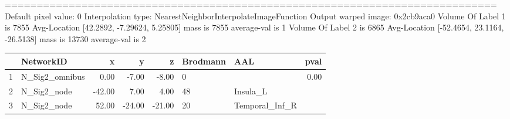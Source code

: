 \documentclass{elsarticle}\usepackage{graphicx, color}
\begin{document}
=============================================================================
Default pixel value: 0
Interpolation type: NearestNeighborInterpolateImageFunction
Output warped image: 0x2cb9aca0
 Volume Of Label 1 is 7855  Avg-Location [42.2892, -7.29624, 5.25805] mass is 7855 average-val is 1
 Volume Of Label 2 is 6865  Avg-Location [-52.4654, 23.1164, -26.5138] mass is 13730 average-val is 2
\begin{table}[ht]
\centering
\begin{tabular}{rlrrrllr}
  \hline
 & NetworkID & x & y & z & Brodmann & AAL & pval \\ 
  \hline
1 & N\_Sig2\_omnibus & 0.00 & -7.00 & -8.00 & 0 &  & 0.00 \\ 
  2 & N\_Sig2\_node & -42.00 & 7.00 & 4.00 & 48 & Insula\_L &  \\ 
  3 & N\_Sig2\_node & 52.00 & -24.00 & -21.00 & 20 & Temporal\_Inf\_R &  \\ 
   \hline
\end{tabular}
\end{table}
\end{document}
